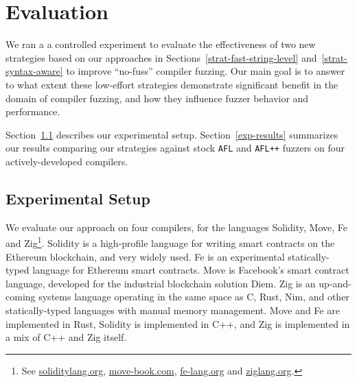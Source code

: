 \section{Evaluation}
\label{eval}

We ran a a controlled experiment to evaluate the effectiveness of two
new strategies based on our approaches in
Sections~\ref{strat-fast-string-level} and~\ref{strat-syntax-aware} to
improve ``no-fuss'' compiler fuzzing. Our main goal is to answer to what
extent these low-effort strategies demonstrate significant benefit in the
domain of compiler fuzzing, and how they influence fuzzer behavior and
performance.

Section~\ref{exp-setup} describes our experimental setup.
Section~\ref{exp-results} summarizes our results comparing our strategies
against stock \texttt{AFL} and \texttt{AFL++} fuzzers on four actively-developed compilers. 

\subsection{Experimental Setup}
\label{exp-setup}

\begin{sloppypar}
We evaluate our approach on four compilers, for the languages
Solidity,
Move, Fe
and
Zig\footnote{See
        \href{https://docs.soliditylang.org}{soliditylang.org},
        \href{https://move-book.com}{move-book.com},
        \href{https://fe-lang.org}{fe-lang.org} and
        \href{https://ziglang.org}{ziglang.org}.}.
Solidity is a high-profile language for writing smart contracts on the Ethereum
blockchain, and very widely used. Fe
is an experimental statically-typed language for Ethereum smart
contracts. Move is Facebook's smart contract language, developed for the
industrial blockchain solution Diem. Zig
is an up-and-coming systems language operating in the same space as C, Rust,
Nim, and other statically-typed languages with manual memory management.
Move and Fe are implemented in Rust, Solidity is implemented in C++, and Zig is
implemented in a mix of C++ and Zig itself.
\end{sloppypar}

